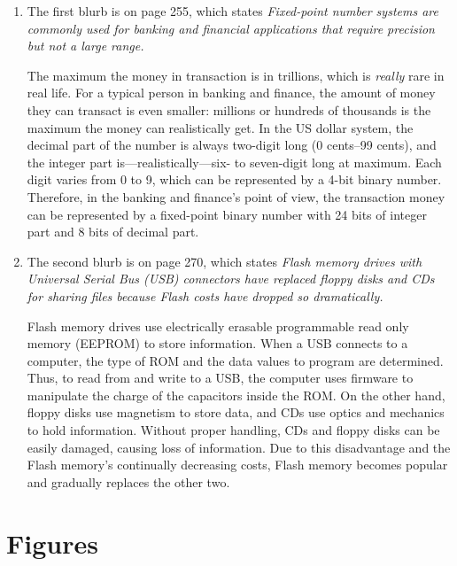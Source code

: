 \documentclass[12pt]{article}
\numberwithin{figure}{subsection}
\numberwithin{table}{subsection}
\numberwithin{equation}{subsection}
\begin{document}
\begin{enumerate}
  \item The first blurb is on page 255, which states \textit{Fixed-point number systems are commonly used for banking and financial applications that require precision but not a large range.}

  The maximum the money in transaction is in trillions, which is \textit{really} rare in real life. For a typical person in banking and finance, the amount of money they can transact is even smaller: millions or hundreds of thousands is the maximum the money can realistically get. In the US dollar system, the decimal part of the number is always two-digit long (0 cents--99 cents), and the integer part is---realistically---six- to seven-digit long at maximum. Each digit varies from 0 to 9, which can be represented by a 4-bit binary number. Therefore, in the banking and finance's point of view, the transaction money can be represented by a fixed-point binary number with 24 bits of integer part and 8 bits of decimal part.

  \item The second blurb is on page 270, which states \textit{Flash memory drives with Universal Serial Bus (USB) connectors have replaced floppy disks and CDs for sharing files because Flash costs have dropped so dramatically.}

  Flash memory drives use electrically erasable programmable read only memory (EEPROM) to store information. When a USB connects to a computer, the type of ROM and the data values to program are determined. Thus, to read from and write to a USB, the computer uses firmware to manipulate the charge of the capacitors inside the ROM. On the other hand, floppy disks use magnetism to store data, and CDs use optics and mechanics to hold information. Without proper handling, CDs and floppy disks can be easily damaged, causing loss of information. Due to this disadvantage and the Flash memory's continually decreasing costs, Flash memory becomes popular and gradually replaces the other two.
\end{enumerate}

\section{Figures}
\end{document}
